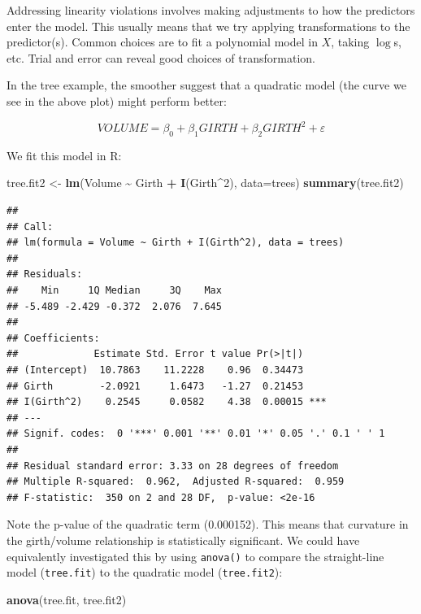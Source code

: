 \documentclass[
]{book}
\newenvironment{Shaded}{\begin{snugshade}}{\end{snugshade}}
\newcommand{\AttributeTok}[1]{\textcolor[rgb]{0.13,0.29,0.53}{#1}}
\newcommand{\DecValTok}[1]{\textcolor[rgb]{0.00,0.00,0.81}{#1}}
\newcommand{\FunctionTok}[1]{\textcolor[rgb]{0.13,0.29,0.53}{\textbf{#1}}}
\newcommand{\NormalTok}[1]{#1}
\newcommand{\OtherTok}[1]{\textcolor[rgb]{0.56,0.35,0.01}{#1}}
\newcommand{\SpecialCharTok}[1]{\textcolor[rgb]{0.81,0.36,0.00}{\textbf{#1}}}
\begin{document}
Addressing linearity violations involves making adjustments to how the predictors enter the model. This usually means that we try applying transformations to the predictor(s). Common choices are to fit a polynomial model in \(X\), taking \(\log\)s, etc. Trial and error can reveal good choices of transformation.

In the tree example, the smoother suggest that a quadratic model (the curve we see in the above plot) might perform better:

\[VOLUME = \beta_0 + \beta_1 GIRTH + \beta_2 GIRTH^2 + \varepsilon\]

We fit this model in R:

\begin{Shaded}
\begin{Highlighting}[]
\NormalTok{tree.fit2 }\OtherTok{\textless{}{-}} \FunctionTok{lm}\NormalTok{(Volume }\SpecialCharTok{\textasciitilde{}}\NormalTok{ Girth }\SpecialCharTok{+} \FunctionTok{I}\NormalTok{(Girth}\SpecialCharTok{\^{}}\DecValTok{2}\NormalTok{), }\AttributeTok{data=}\NormalTok{trees)}
\FunctionTok{summary}\NormalTok{(tree.fit2)}
\end{Highlighting}
\end{Shaded}

\begin{verbatim}
## 
## Call:
## lm(formula = Volume ~ Girth + I(Girth^2), data = trees)
## 
## Residuals:
##    Min     1Q Median     3Q    Max 
## -5.489 -2.429 -0.372  2.076  7.645 
## 
## Coefficients:
##             Estimate Std. Error t value Pr(>|t|)    
## (Intercept)  10.7863    11.2228    0.96  0.34473    
## Girth        -2.0921     1.6473   -1.27  0.21453    
## I(Girth^2)    0.2545     0.0582    4.38  0.00015 ***
## ---
## Signif. codes:  0 '***' 0.001 '**' 0.01 '*' 0.05 '.' 0.1 ' ' 1
## 
## Residual standard error: 3.33 on 28 degrees of freedom
## Multiple R-squared:  0.962,  Adjusted R-squared:  0.959 
## F-statistic:  350 on 2 and 28 DF,  p-value: <2e-16
\end{verbatim}

Note the p-value of the quadratic term (0.000152). This means that curvature in the girth/volume relationship is statistically significant. We could have equivalently investigated this by using \texttt{anova()} to compare the straight-line model (\texttt{tree.fit}) to the quadratic model (\texttt{tree.fit2}):

\begin{Shaded}
\begin{Highlighting}[]
\FunctionTok{anova}\NormalTok{(tree.fit, tree.fit2)}
\end{Highlighting}
\end{Shaded}
\end{document}
